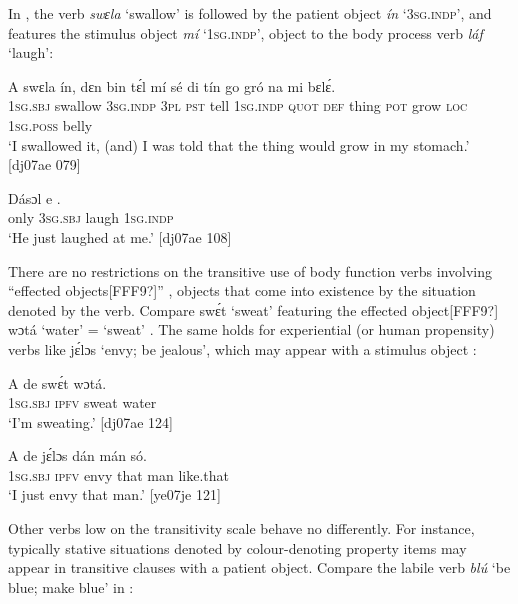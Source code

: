 In , the verb \textit{swɛla} ‘swallow’ is followed by the patient object \textit{ín} ‘\textsc{3sg.indp}’, and  features the stimulus object \textit{mí} ‘\textsc{1sg.indp}’, object to the body process verb \textit{láf} ‘laugh’: 



\ea%
    \label{ex:key:1101}
    \gll A    swɛla  ín,    dɛn  bin  tɛ́l  mí    sé
di  tín    go  gró  na  mi    bɛlɛ́.\\
\textsc{1sg.sbj}  swallow  \textsc{3sg.indp}  \textsc{3pl}  \textsc{pst}  tell  \textsc{1sg.indp}  \textsc{quot}
\textsc{def}  thing  \textsc{pot} grow  \textsc{loc}  \textsc{1sg.poss}  belly\\

\glt ‘I swallowed it, (and) I was told that the thing would grow in my stomach.’ [dj07ae 079]
\z


\ea%
    \label{ex:key:1102}
    \gll Dásɔl  e        .\\
only    \textsc{3sg.sbj}  laugh  \textsc{1sg.indp}\\

\glt ‘He just laughed at me.’ [dj07ae 108]
\z

There are no restrictions on the transitive use of body function verbs involving “effected objects[FFF9?]” \citep{Hopper1985}, objects that come into existence by the situation denoted by the verb. Compare swɛ́t ‘sweat’ featuring the effected object[FFF9?] wɔtá ‘water’ = ‘sweat’ . The same holds for experiential (or human propensity) verbs like jɛ́lɔs ‘envy; be jealous’, which may appear with a stimulus object : 


\ea%
    \label{ex:key:1103}
    \gll A    de    swɛ́t  wɔtá.\\
\textsc{1sg.sbj}  \textsc{ipfv}    sweat  water\\

\glt ‘I’m sweating.’ [dj07ae 124]
\z


\ea%
    \label{ex:key:1104}
    \gll A    de  jɛ́lɔs  dán    mán  só.\\
\textsc{1sg.sbj}  \textsc{ipfv}  envy  that    man    like.that\\

\glt ‘I just envy that man.’ [ye07je 121]
\z

Other verbs low on the transitivity scale behave no differently. For instance, typically stative situations denoted by colour-denoting property items may appear in transitive clauses with a patient object. Compare the labile verb \textit{blú} ‘be blue; make blue’ in :


